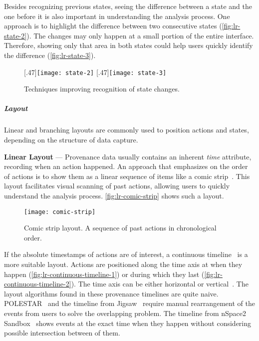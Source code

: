 Besides recognizing previous states, seeing the difference between a state and the one before it is also important in understanding the analysis process. One approach is to highlight the difference between two consecutive states (\autoref{fig:lr-state-2}). The changes may only happen at a small portion of the entire interface. Therefore, showing only that area in both states could help users quickly identify the difference (\autoref{fig:lr-state-3}).

\begin{figure}[!htb]
\centering
{}[.47\columnwidth]{\texttt{[image: state-2]}} 
\hfill
{}[.47\columnwidth]{\texttt{[image: state-3]}}
\caption{Techniques improving recognition of state changes.}
\end{figure}

\subparagraph{Layout} Linear and branching layouts are commonly used to position actions and states, depending on the structure of data capture.

\textbf{Linear Layout} --- Provenance data usually contains an inherent \emph{time} attribute, recording when an action happened. An approach that emphasizes on the order of actions is to show them as a linear sequence of items like a comic strip~\cite{Kurlander1988,Meng1998}. This layout facilitates visual scanning of past actions, allowing users to quickly understand the analysis process. \autoref{fig:lr-comic-strip} shows such a layout.

\begin{figure}[!htb]
	\centering
	\texttt{[image: comic-strip]}
	\caption{Comic strip layout. A sequence of past actions in chronological order. }
	\label{fig:lr-comic-strip}
\end{figure}

If the absolute timestamps of actions are of interest, a continuous timeline~\cite{Derthick2001} is a more suitable layout. Actions are positioned along the time axis at when they happen (\autoref{fig:lr-continuous-timeline-1}) or during which they last (\autoref{fig:lr-continuous-timeline-2}). The time axis can be either horizontal or vertical~\cite{SandboxTimeline2012}. The layout algorithms found in these provenance timelines are quite naive. POLESTAR~\cite{Pioch2006} and the timeline from Jigsaw~\cite{Liu2010} require manual rearrangement of the events from users to solve the overlapping problem. The timeline from nSpace2 Sandbox~\cite{SandboxTimeline2012} shows events at the exact time when they happen without considering possible intersection between of them.

